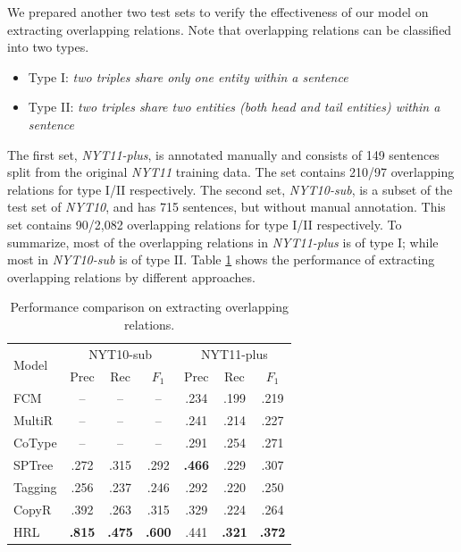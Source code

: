 \documentclass[letterpaper]{article} %
\theoremstyle{definition}
\begin{document}
We prepared another two test sets to verify the effectiveness of our model on extracting overlapping relations. Note that overlapping relations can be classified into two types. 
\begin{itemize}
    \item Type I: {\it two triples share only one entity within a sentence}
    \item Type II: {\it two triples share two entities (both head and tail entities) within a sentence}
\end{itemize}
The first set,
\textit{NYT11-plus}, is annotated manually and consists of 149 sentences split from the original \textit{NYT11} training data. The set contains 210/97 overlapping relations for type I/II respectively.
The second set,
\textit{NYT10-sub}, is a subset of the test set of \textit{NYT10}, and has 715 sentences, but without manual annotation. This set contains 90/2,082 overlapping relations for type I/II respectively. To summarize, most of the overlapping relations in \textit{NYT11-plus} is of type I; while most in \textit{NYT10-sub} is of type II.
Table \ref{overlapping} shows the performance of extracting overlapping relations by different approaches. 

\begin{table}[!htb]
    \centering
    \begin{tabular}{lcccccc}
    \toprule
        \multirow{2}{*}{Model} & \multicolumn{3}{c}{NYT10-sub} & \multicolumn{3}{c}{NYT11-plus}  \\
        & Prec & Rec & $F_1$ & Prec & Rec & $F_1$ \\
    \midrule
        FCM    & -- & -- & -- & .234 & .199 & .219 \\
        MultiR & -- & -- & -- & .241 & .214 & .227 \\
        CoType & -- & -- & -- & .291 & .254 & .271 \\
        SPTree & .272 & .315 & .292 & \textbf{.466} & .229 & .307 \\
        Tagging & .256 & .237 & .246 & .292 & .220 & .250 \\
        CopyR & .392 & .263 & .315 & .329 & .224 & .264 \\
    \midrule
        HRL    & \textbf{.815} & \textbf{.475} & \textbf{.600} & .441 & \textbf{.321} & \textbf{.372} \\
    \bottomrule
    \end{tabular}
    \caption{Performance comparison on extracting overlapping relations.}
    \label{overlapping}
\end{table} %
\end{document}
